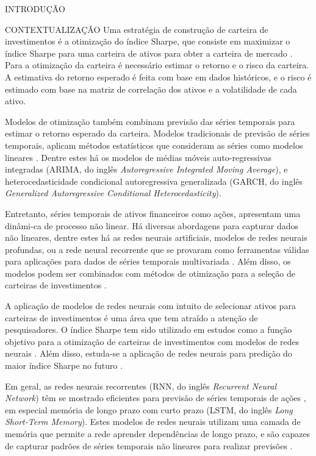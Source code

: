 \begin{section}{INTRODUÇÃO}
\begin{subsection}{CONTEXTUALIZAÇÃO}
        \ipar Uma estratégia de construção de carteira de investimentos é a otimização do índice Sharpe, que consiste em maximizar o índice Sharpe para uma carteira de ativos para obter a carteira de mercado \cite{maree2022balancing}. Para a otimização da carteira é necessário estimar o retorno e o risco da carteira. A estimativa do retorno esperado é feita com base em dados históricos, e o risco é estimado com base na matriz de correlação dos ativos e a volatilidade de cada ativo.

        \ipar Modelos de otimização também combinam previsão das séries temporais para estimar o retorno esperado da carteira. Modelos tradicionais de previsão de séries temporais, aplicam métodos estatísticos que consideram as séries como modelos lineares \cite{zhou2023twostage}. Dentre estes há os modelos de médias móveis auto-regressivas integradas (\acrshort{ARIMA}, do inglês \textit{Autoregressive Integrated Moving Average}), e heterocedasticidade condicional autoregressiva generalizada (\acrshort{GARCH}, do inglês \textit{Generalized Autoregressive Conditional Heterocedasticity}). 
        
        \ipar Entretanto, séries temporais de ativos financeiros como ações, apresentam uma dinâmi-ca de processo não linear. Há diversas abordagens para capturar dados não lineares, dentre estes há as redes neurais artificiais, modelos de redes neurais profundas, ou a rede neural recorrente que se provaram como ferramentas válidas para aplicações para dados de séries temporais multivariada \cite{cao2020delafo}. Além disso, os modelos podem ser combinados com métodos de otimização para a seleção de carteiras de investimentos \cite{du2022mean}.

        \ipar A aplicação de modelos de redes neurais com intuito de selecionar ativos para carteiras de investimentos é uma área que tem atraído a atenção de pesquisadores. O índice Sharpe tem sido utilizado em estudos como a função objetivo para a otimização de carteiras de investimentos com modelos de redes neurais \cite{tran2023optimizing}. Além disso, estuda-se a aplicação de redes neurais para predição do maior índice Sharpe no futuro \cite{vukovic2020neural}.

        \ipar Em geral, as redes neurais recorrentes (\acrshort{RNN}, do inglês \textit{Recurrent Neural Network}) têm se mostrado eficientes para previsão de séries temporais de ações \cite{wang2020portfolio}, em especial memória de longo prazo com curto prazo (\acrshort{LSTM}, do inglês \textit{Long Short-Term Memory}). Estes modelos de redes neurais utilizam uma camada de memória que permite a rede aprender dependências de longo prazo, e são capazes de capturar padrões de séries temporais não lineares para realizar previsões \cite{hochreiter1997long}.


\end{subsection}
\end{section}
